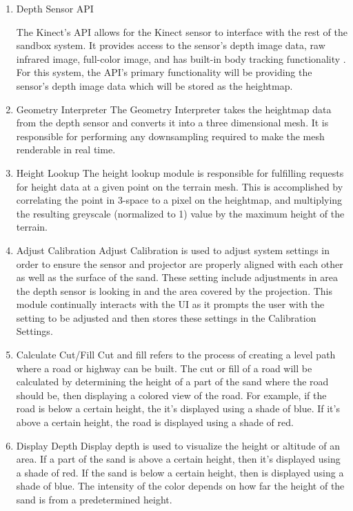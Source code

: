 \begin{enumerate}
\item{Depth Sensor API} %

The Kinect's API allows for the Kinect sensor to interface with the rest of the sandbox system.
It provides access to the sensor's depth image data, raw infrared image, full-color image, and has built-in body tracking functionality .
For this system, the API's primary functionality will be providing the sensor's depth image data which will be stored as the heightmap.


\item{Geometry Interpreter} %
The Geometry Interpreter takes the heightmap data from the depth sensor and converts it into a three dimensional mesh.
It is responsible for performing any downsampling required to make the mesh renderable in real time.

\item{Height Lookup}
The height lookup module is responsible for fulfilling requests for height data at a given point on the terrain mesh.
This is accomplished by correlating the point in 3-space to a pixel on the heightmap, and multiplying the resulting greyscale (normalized to 1) value by the maximum height of the terrain.

\item{Adjust Calibration} %
Adjust Calibration is used to adjust system settings in order to ensure the sensor and projector are properly aligned with each other as well as the surface of the sand.  
These setting include adjustments in area the depth sensor is looking in and the area covered by the projection.
This module continually interacts with the UI as it prompts the user with the setting to be adjusted and then stores these settings in the Calibration Settings.

\item{Calculate Cut/Fill} %
Cut and fill refers to the process of creating a level path where a road or highway can be built.
The cut or fill of a road will be calculated by determining the height of a part of the sand where the road should be, then displaying a colored view of the road.
For example, if the road is below a certain height, the it's displayed using a shade of blue.
If it's above a certain height, the road is displayed using a shade of red.

\item{Display Depth} %
Display depth is used to visualize the height or altitude of an area.
If a part of the sand is above a certain height, then it's displayed using a shade of red.
If the sand is below a certain height, then is displayed using a shade of blue.
The intensity of the color depends on how far the height of the sand is from a predetermined height.


\end{enumerate}
